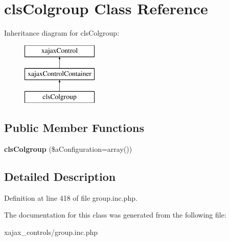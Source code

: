 \hypertarget{classclsColgroup}{
\section{clsColgroup Class Reference}
\label{classclsColgroup}
}
Inheritance diagram for clsColgroup:\begin{figure}[H]
\begin{center}
\leavevmode
\includegraphics[height=3.000000cm]{classclsColgroup}
\end{center}
\end{figure}
\subsection*{Public Member Functions}
\begin{DoxyCompactItemize}
\item 
\hypertarget{classclsColgroup_afbf4f9602160ea4cae4d0d941bee06c9}{
{\bfseries clsColgroup} (\$aConfiguration=array())}
\label{classclsColgroup_afbf4f9602160ea4cae4d0d941bee06c9}

\end{DoxyCompactItemize}


\subsection{Detailed Description}


Definition at line 418 of file group.inc.php.



The documentation for this class was generated from the following file:\begin{DoxyCompactItemize}
\item 
xajax\_\-controls/group.inc.php\end{DoxyCompactItemize}
